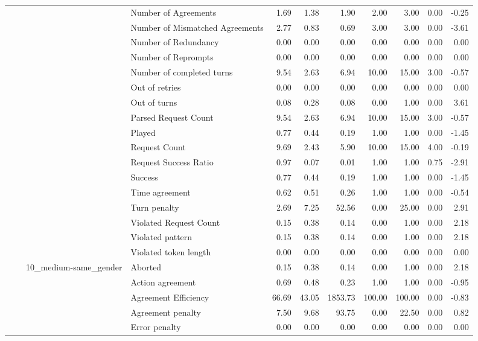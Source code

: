 \begin{tabular}{llllrrrrrrr}
 &  &  & Number of Agreements & 1.69 & 1.38 & 1.90 & 2.00 & 3.00 & 0.00 & -0.25 \\
 &  &  & Number of Mismatched Agreements & 2.77 & 0.83 & 0.69 & 3.00 & 3.00 & 0.00 & -3.61 \\
 &  &  & Number of Redundancy & 0.00 & 0.00 & 0.00 & 0.00 & 0.00 & 0.00 & 0.00 \\
 &  &  & Number of Reprompts & 0.00 & 0.00 & 0.00 & 0.00 & 0.00 & 0.00 & 0.00 \\
 &  &  & Number of completed turns & 9.54 & 2.63 & 6.94 & 10.00 & 15.00 & 3.00 & -0.57 \\
 &  &  & Out of retries & 0.00 & 0.00 & 0.00 & 0.00 & 0.00 & 0.00 & 0.00 \\
 &  &  & Out of turns & 0.08 & 0.28 & 0.08 & 0.00 & 1.00 & 0.00 & 3.61 \\
 &  &  & Parsed Request Count & 9.54 & 2.63 & 6.94 & 10.00 & 15.00 & 3.00 & -0.57 \\
 &  &  & Played & 0.77 & 0.44 & 0.19 & 1.00 & 1.00 & 0.00 & -1.45 \\
 &  &  & Request Count & 9.69 & 2.43 & 5.90 & 10.00 & 15.00 & 4.00 & -0.19 \\
 &  &  & Request Success Ratio & 0.97 & 0.07 & 0.01 & 1.00 & 1.00 & 0.75 & -2.91 \\
 &  &  & Success & 0.77 & 0.44 & 0.19 & 1.00 & 1.00 & 0.00 & -1.45 \\
 &  &  & Time agreement & 0.62 & 0.51 & 0.26 & 1.00 & 1.00 & 0.00 & -0.54 \\
 &  &  & Turn penalty & 2.69 & 7.25 & 52.56 & 0.00 & 25.00 & 0.00 & 2.91 \\
 &  &  & Violated Request Count & 0.15 & 0.38 & 0.14 & 0.00 & 1.00 & 0.00 & 2.18 \\
 &  &  & Violated pattern & 0.15 & 0.38 & 0.14 & 0.00 & 1.00 & 0.00 & 2.18 \\
 &  &  & Violated token length & 0.00 & 0.00 & 0.00 & 0.00 & 0.00 & 0.00 & 0.00 \\
\cline{3-11}
 &  & \multirow[t]{27}{*}{10_medium-same_gender} & Aborted & 0.15 & 0.38 & 0.14 & 0.00 & 1.00 & 0.00 & 2.18 \\
 &  &  & Action agreement & 0.69 & 0.48 & 0.23 & 1.00 & 1.00 & 0.00 & -0.95 \\
 &  &  & Agreement Efficiency & 66.69 & 43.05 & 1853.73 & 100.00 & 100.00 & 0.00 & -0.83 \\
 &  &  & Agreement penalty & 7.50 & 9.68 & 93.75 & 0.00 & 22.50 & 0.00 & 0.82 \\
 &  &  & Error penalty & 0.00 & 0.00 & 0.00 & 0.00 & 0.00 & 0.00 & 0.00 \\

\end{tabular}
